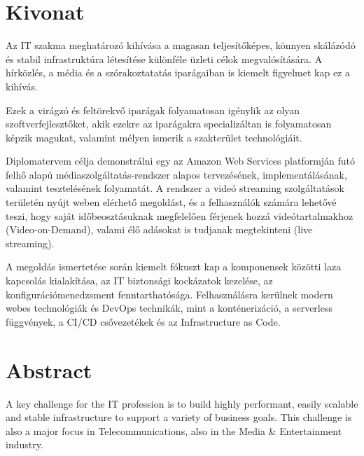 \setcounter{page}{1}

\selecthungarian

\chapter*{Kivonat}

Az IT szakma meghatározó kihívása a magasan teljesítőképes, könnyen skálázódó és stabil infrastruktúra létesítése különféle üzleti célok megvalósítására. A hírközlés, a média és a szórakoztatatás iparágaiban is kiemelt figyelmet kap ez a kihívás.

Ezek a virágzó és feltörekvő iparágak folyamatosan igénylik az olyan szoftverfejlesztőket, akik ezekre az iparágakra specializáltan is folyamatosan képzik magukat, valamint mélyen ismerik a szakterület technológiáit.

Diplomatervem célja demonstrálni egy az Amazon Web Services platformján futó felhő alapú médiaszolgáltatás-rendszer alapos tervezésének, implementálásának, valamint tesztelésének folyamatát. A rendszer a videó streaming szolgáltatások területén nyújt weben elérhető megoldást, és a felhasználók számára lehetővé teszi, hogy saját időbeosztásuknak megfelelően férjenek hozzá videótartalmakhoz (Video-on-Demand), valami élő adásokat is tudjanak megtekinteni (live streaming).

A megoldás ismertetése során kiemelt fókuszt kap a komponensek közötti laza kapcsolás kialakítása, az IT biztonsági kockázatok kezelése, az konfigurációmenedzsment fenntarthatósága. Felhasználásra kerülnek modern webes technológiák és DevOps technikák, mint a konténerizáció, a serverless függvények, a CI/CD csővezetékek és az Infrastructure as Code.

\vfill
\selectenglish

\chapter*{Abstract}

A key challenge for the IT profession is to build highly performant, easily scalable and stable infrastructure to support a variety of business goals. This challenge is also a major focus in Telecommunications, also in the Media \& Entertainment industry.

